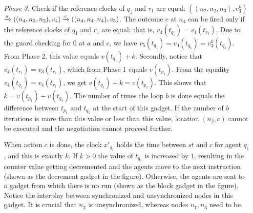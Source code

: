 \noindent \emph{Phase 3.} Check if the reference clocks of $q_1$ and $r_1$
are equal: $((n_2, n_2, n_3), v_3^k)$
$\xrightarrow{a} ((n_4, n_3, n_3), v_4) \xrightarrow{c} ((n_4, n_4, n_4), v_5)$. The
outcome $c$ at $n_4$ can be fired only if the reference clocks of
$q_1$ and $r_1$ are equal: that is, $v_4(t_{q_1}) = v_4(t_{r_1})$. Due
to the guard checking for $0$ at $a$ and $c$, we have
$v_5(t_{q_1}) = v_4(t_{q_1}) = v_3^k(t_{q_1})$. From Phase 2, this
value equals $v(t_{q_1}) + k$. Secondly, notice that
$v_4(t_{r_1}) = v_3(t_{r_1})$, which from Phase 1 equals
$v(t_{p_1})$. From the equality $v_4(t_{q_1}) = v_4(t_{r_1})$, we get
$v(t_{q_1}) + k = v(t_{p_1})$.  This shows that
$k = v(t_{p_1}) - v({t_{q_1}})$. The number of times the loop $b$ is
done equals the difference between $t_{p_1}$ and $t_{q_1}$ at the
start of this gadget. If the number of $b$ iterations is more than
this value or less than this value, location $(n_3, c)$ cannot be
executed and the negotiation cannot proceed further. 


When action $c$ is done, the clock $x'_{q_1}$ holds the time between
$st$ and $c$ for agent $q_1$, and this is exactly $k$. If $k > 0$ the
value of $t_{q_1}$ is increased by $1$, resulting in the counter value
getting decremented and the agents move to the next instruction (shown
as the decrement gadget in the figure). Otherwise, the agents are sent
to a gadget from which there is no run (shown as the block gadget in
the figure).
Notice the interplay between synchronized and unsynchronized nodes in
this gadget. It is crucial that $n_2$ is unsynchronized, whereas
nodes $n_1, n_3$ need to be.

